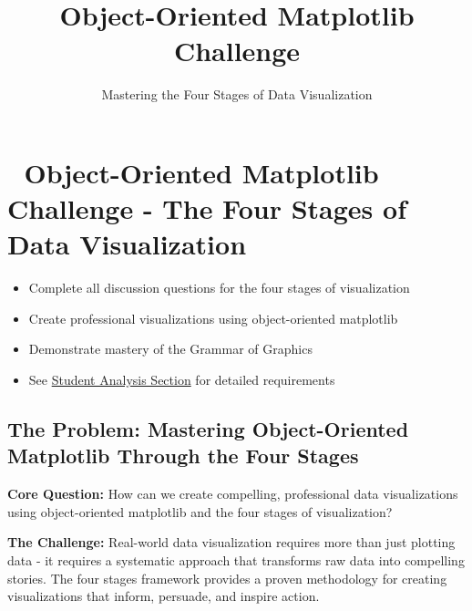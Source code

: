 \documentclass[
  letterpaper,
  DIV=11,
  numbers=noendperiod]{scrartcl}
\title{Object-Oriented Matplotlib Challenge}
\subtitle{Mastering the Four Stages of Data Visualization}
\author{}
\date{}
\providecommand{\tightlist}{%
  \setlength{\itemsep}{0pt}\setlength{\parskip}{0pt}}
\begin{document}
\maketitle


\section{🎯 Object-Oriented Matplotlib Challenge - The Four Stages of
Data
Visualization}\label{object-oriented-matplotlib-challenge---the-four-stages-of-data-visualization}

\begin{tcolorbox}[enhanced jigsaw, rightrule=.15mm, coltitle=black, colbacktitle=quarto-callout-important-color!10!white, opacitybacktitle=0.6, arc=.35mm, leftrule=.75mm, colback=white, title=\textcolor{quarto-callout-important-color}{\faExclamation}\hspace{0.5em}{📊 Challenge Requirements}, colframe=quarto-callout-important-color-frame, bottomrule=.15mm, left=2mm, opacityback=0, toptitle=1mm, titlerule=0mm, toprule=.15mm, bottomtitle=1mm, breakable]

\begin{itemize}
\tightlist
\item
  Complete all discussion questions for the four stages of visualization
\item
  Create professional visualizations using object-oriented matplotlib
\item
  Demonstrate mastery of the Grammar of Graphics
\item
  See \hyperref[student-analysis-section]{Student Analysis Section} for
  detailed requirements
\end{itemize}

\end{tcolorbox}

\subsection{The Problem: Mastering Object-Oriented Matplotlib Through
the Four
Stages}\label{the-problem-mastering-object-oriented-matplotlib-through-the-four-stages}

\textbf{Core Question:} How can we create compelling, professional data
visualizations using object-oriented matplotlib and the four stages of
visualization?

\textbf{The Challenge:} Real-world data visualization requires more than
just plotting data - it requires a systematic approach that transforms
raw data into compelling stories. The four stages framework provides a
proven methodology for creating visualizations that inform, persuade,
and inspire action.
\end{document}
